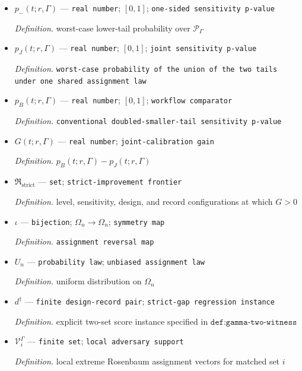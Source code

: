 \documentclass{article}
\begin{document}
\begin{itemize}
  \item \(p_-(t;r,\Gamma)\) --- \texttt{real number}; \([0,1]\); \texttt{one-\allowbreak{}sided sensitivity p-\allowbreak{}value}
  \par\smallskip\noindent\emph{Definition.} worst-case lower-tail probability over \(\mathcal P_\Gamma\)
  \item \(p_J(t;r,\Gamma)\) --- \texttt{real number}; \([0,1]\); \texttt{joint sensitivity p-\allowbreak{}value}
  \par\smallskip\noindent\emph{Definition.} \texttt{worst-\allowbreak{}case probability of the union of the two tails under one shared assignment law}
  \item \(p_B(t;r,\Gamma)\) --- \texttt{real number}; \([0,1]\); \texttt{workflow comparator}
  \par\smallskip\noindent\emph{Definition.} \texttt{conventional doubled-\allowbreak{}smaller-\allowbreak{}tail sensitivity p-\allowbreak{}value}
  \item \(G(t;r,\Gamma)\) --- \texttt{real number}; \texttt{joint-\allowbreak{}calibration gain}
  \par\smallskip\noindent\emph{Definition.} \(p_B(t;r,\Gamma)-p_J(t;r,\Gamma)\)
  \item \(\mathfrak R_{\mathrm{strict}}\) --- \texttt{set}; \texttt{strict-\allowbreak{}improvement frontier}
  \par\smallskip\noindent\emph{Definition.} level, sensitivity, design, and record configurations at which \(G>0\)
  \item \(\iota\) --- \texttt{bijection}; \(\Omega_n\to\Omega_n\); \texttt{symmetry map}
  \par\smallskip\noindent\emph{Definition.} \texttt{assignment reversal map}
  \item \(U_n\) --- \texttt{probability law}; \texttt{unbiased assignment law}
  \par\smallskip\noindent\emph{Definition.} uniform distribution on \(\Omega_n\)
  \item \(d^\dagger\) --- \texttt{finite design-\allowbreak{}record pair}; \texttt{strict-\allowbreak{}gap regression instance}
  \par\smallskip\noindent\emph{Definition.} explicit two-set score instance specified in \(\texttt{def:gamma-two-witness}\)
  \item \(\mathcal V_i^\Gamma\) --- \texttt{finite set}; \texttt{local adversary support}
  \par\smallskip\noindent\emph{Definition.} local extreme Rosenbaum assignment vectors for matched set \(i\)

\end{itemize}
\end{document}
